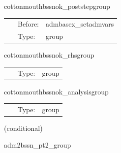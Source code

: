 \documentclass{article}
\begin{document}
\vspace{5mm}


\hspace{5mm} cottonmouthbssnok\_poststepgroup 

\hspace{5mm}{\it bssnok post-step routines } 


\hspace{5mm}

 \begin{tabular*}{160mm}{cll} 
~ & Before:  & admbasex\_setadmvars \\ 
~ & Type:  & group \\ 
\end{tabular*} 


\vspace{5mm}


\hspace{5mm} cottonmouthbssnok\_rhsgroup 

\hspace{5mm}{\it bssnok equations rhs computation } 


\hspace{5mm}

 \begin{tabular*}{160mm}{cll} 
~ & Type:  & group \\ 
\end{tabular*} 


\vspace{5mm}


\hspace{5mm} cottonmouthbssnok\_analysisgroup 

\hspace{5mm}{\it bssnok analysis routines } 


\hspace{5mm}

 \begin{tabular*}{160mm}{cll} 
~ & Type:  & group \\ 
\end{tabular*} 


\vspace{5mm}

   (conditional) 

\hspace{5mm} adm2bssn\_pt2\_group 
\end{document}
